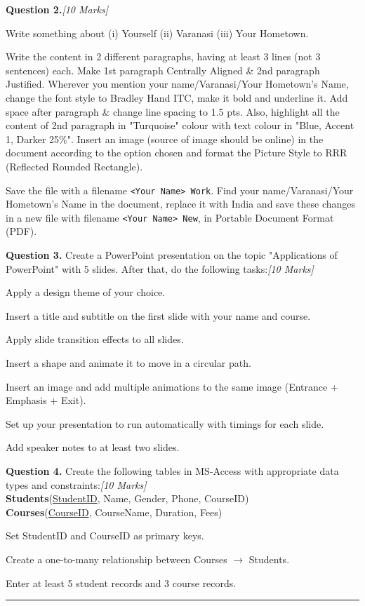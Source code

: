 \documentclass[11pt,a4paper]{article}
\newcommand{\pts}[1]{\hfill\textit{[#1]}}
\begin{document}
\bigskip
\noindent\textbf{Question 2.}\pts{10 Marks}
\begin{parts}
  \item Write something about (i) Yourself (ii) Varanasi (iii) Your Hometown.
  \item Write the content in 2 different paragraphs, having at least 3 lines (not 3 sentences) each. Make 1st paragraph Centrally Aligned \& 2nd paragraph Justified. Wherever you mention your name/Varanasi/Your Hometown's Name, change the font style to Bradley Hand ITC, make it bold and underline it. Add space after paragraph \& change line spacing to 1.5 pts. Also, highlight all the content of 2nd paragraph in "Turquoise" colour with text colour in "Blue, Accent 1, Darker 25\%". Insert an image (source of image should be online) in the document according to the option chosen and format the Picture Style to RRR (Reflected Rounded Rectangle).
  \item Save the file with a filename \texttt{<Your Name> Work}. Find your name/Varanasi/Your Hometown's Name in the document, replace it with India and save these changes in a new file with filename \texttt{<Your Name> New}, in Portable Document Format (PDF).
\end{parts}

\bigskip
\noindent\textbf{Question 3.} Create a PowerPoint presentation on the topic "Applications of PowerPoint" with 5 slides. After that, do the following tasks:\pts{10 Marks}
\begin{parts}
  \item Apply a design theme of your choice.
  \item Insert a title and subtitle on the first slide with your name and course.
  \item Apply slide transition effects to all slides.
  \item Insert a shape and animate it to move in a circular path.
  \item Insert an image and add multiple animations to the same image (Entrance + Emphasis + Exit).
  \item Set up your presentation to run automatically with timings for each slide.
  \item Add speaker notes to at least two slides.
\end{parts}

\bigskip
\noindent\textbf{Question 4.} Create the following tables in MS-Access with appropriate data types and constraints:\pts{10 Marks}\\
\textbf{Students}(\underline{StudentID}, Name, Gender, Phone, CourseID)\\
\textbf{Courses}(\underline{CourseID}, CourseName, Duration, Fees)
\begin{parts}
  \item Set StudentID and CourseID as primary keys.
  \item Create a one-to-many relationship between Courses $\rightarrow$ Students.
  \item Enter at least 5 student records and 3 course records.
\end{parts}

\vfill\rule{\linewidth}{0.4pt}
\end{document}
